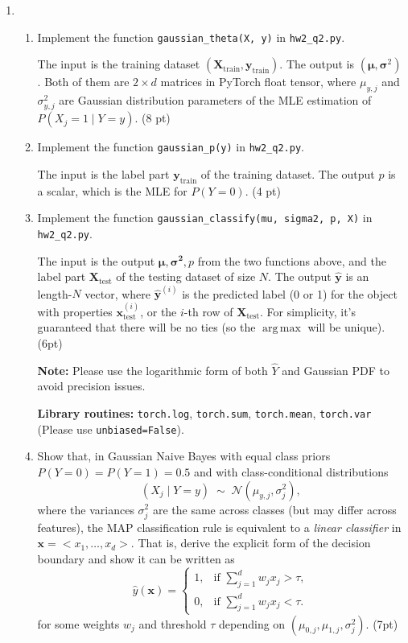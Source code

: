 \documentclass{article}
\newcommand{\bx}{{\boldsymbol x}}
\DeclareMathOperator*{\argmax}{arg\,max}
\theoremstyle{definition}
\theoremstyle{remark}
\newenvironment{Q}
        {%
          \clearpage
          \item
        }
        {%
          \phantom{s} %
          \bigskip
        }
\begin{document}
\begin{enumerate}[font={\Large\bfseries},left=0pt]
\begin{Q}
\begin{enumerate}
\item Implement the function \texttt{gaussian\_theta(X, y)} in \texttt{hw2\_q2.py}. 

The input is the training dataset $(\bm{X}_\mathrm{train},\bm{y}_\mathrm{train})$. The output is $(\bm{\mu}, \bm{\sigma}^2)$. Both of them are $2\times d$ matrices in PyTorch float tensor, where $\mu_{y,j}$ and $\sigma_{y,j}^2$ are Gaussian distribution parameters of the MLE estimation of $P(X_j=1\mid Y=y)$. (8 pt)


\item Implement the function \texttt{gaussian\_p(y)} in \texttt{hw2\_q2.py}. 

The input is the label part $\bm{y}_\mathrm{train}$ of the training dataset. The output $p$ is a scalar, which is the MLE for $P(Y=0)$. (4 pt)

\item Implement the function \texttt{gaussian\_classify(mu, sigma2, p, X)} in \texttt{hw2\_q2.py}. 

The input is the output $\bm{\mu},\bm{\sigma^2},p$ from the two functions above, and the label part $\bm{X}_\mathrm{test}$ of the testing dataset of size $N$. The output $\bm{\widehat{y}}$ is an length-$N$ vector, where $\bm{\widehat{y}}^{(i)}$ is the predicted label (0 or 1) for the object with properties $\bm{x}^{(i)}_\mathrm{test}$, or the $i$-th row of $\bm{X}_\mathrm{test}$. For simplicity, it's guaranteed that there will be no ties (so the $\argmax$ will be unique). (6pt)

\textbf{Note:} Please use the logarithmic form of both $\widehat{Y}$ and Gaussian  PDF  to avoid precision issues.

\textbf{Library routines:} \texttt{torch.log}, \texttt{torch.sum}, \texttt{torch.mean}, \texttt{torch.var} (Please use \texttt{unbiased=False}).
\item 
Show that, in Gaussian Naive Bayes with equal class priors $P(Y=0)=P(Y=1)=0.5$ and 
with class-conditional distributions
\[
(X_j \mid Y=y) \;\sim\; \mathcal N(\mu_{y,j}, \sigma_j^2),
\]
where the variances $\sigma_j^2$ are the same across classes (but may differ across features),  
the MAP classification rule is equivalent to a \emph{linear classifier} in $\bx=< x_1,\dots,x_d >$.  
That is, derive the explicit form of the decision boundary and show it can be written as
\[
\widehat{ y}(\bx) =
\begin{cases}
1, & \text{if } \sum_{j=1}^d w_j x_j > \tau,\\
0, & \text{if } \sum_{j=1}^d w_j x_j < \tau.
\end{cases}
\]
for some weights $w_j$ and threshold $\tau$ depending on $(\mu_{0,j},\mu_{1,j},\sigma_j^2)$. (7pt)


\end{enumerate}
\end{Q}
\end{enumerate}
\end{document}
